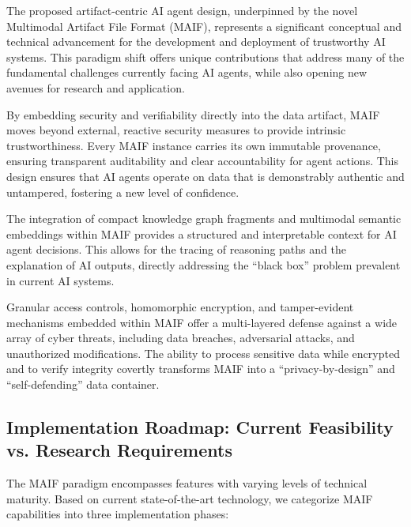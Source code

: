 \documentclass[conference]{IEEEtran}
\begin{document}
The proposed artifact-centric AI agent design, underpinned by the novel Multimodal Artifact File Format (MAIF), represents a significant conceptual and technical advancement for the development and deployment of trustworthy AI systems. This paradigm shift offers unique contributions that address many of the fundamental challenges currently facing AI agents, while also opening new avenues for research and application.

By embedding security and verifiability directly into the data artifact, MAIF moves beyond external, reactive security measures to provide intrinsic trustworthiness. Every MAIF instance carries its own immutable provenance, ensuring transparent auditability and clear accountability for agent actions\cite{ref4}. This design ensures that AI agents operate on data that is demonstrably authentic and untampered, fostering a new level of confidence.

The integration of compact knowledge graph fragments and multimodal semantic embeddings within MAIF provides a structured and interpretable context for AI agent decisions\cite{ref26}. This allows for the tracing of reasoning paths and the explanation of AI outputs, directly addressing the ``black box'' problem prevalent in current AI systems\cite{ref4}.

Granular access controls, homomorphic encryption, and tamper-evident mechanisms embedded within MAIF offer a multi-layered defense against a wide array of cyber threats, including data breaches, adversarial attacks, and unauthorized modifications\cite{ref69}. The ability to process sensitive data while encrypted and to verify integrity covertly transforms MAIF into a ``privacy-by-design'' and ``self-defending'' data container.


\subsection{Implementation Roadmap: Current Feasibility vs. Research Requirements}

The MAIF paradigm encompasses features with varying levels of technical maturity. Based on current state-of-the-art technology, we categorize MAIF capabilities into three implementation phases:
\end{document}
